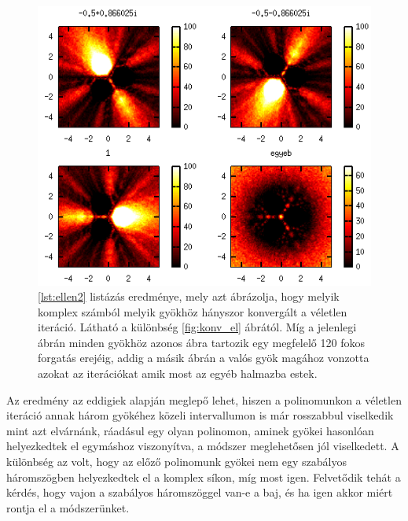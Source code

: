 \documentclass[a4paper,12pt]{report}
\begin{document}
                \begin{figure}[ht]
					\centering
					\includegraphics[scale=0.6]{veletlen.png}
					\caption{\ref{lst:ellen2} listázás eredménye, mely azt ábrázolja, hogy melyik komplex számból melyik gyökhöz hányszor konvergált a véletlen iteráció. Látható a különbség \ref{fig:konv_el} ábrától. Míg a jelenlegi ábrán minden gyökhöz azonos ábra tartozik egy megfelelő 120 fokos forgatás erejéig, addig a másik ábrán a valós gyök magához vonzotta azokat az iterációkat amik most az egyéb halmazba estek.}
				\end{figure}

Az eredmény az eddigiek alapján meglepő lehet, hiszen a polinomunkon a véletlen iteráció annak három gyökéhez közeli intervallumon is már rosszabbul viselkedik mint azt elvárnánk, ráadásul egy olyan polinomon, aminek gyökei hasonlóan helyezkedtek el egymáshoz viszonyítva, a módszer meglehetősen jól viselkedett. A különbség az volt, hogy az előző polinomunk gyökei nem egy szabályos háromszögben helyezkedtek el a komplex síkon, míg most igen. Felvetődik tehát a kérdés, hogy vajon a szabályos háromszöggel van-e a baj, és ha igen akkor miért rontja el a módszerünket.
\end{document}
